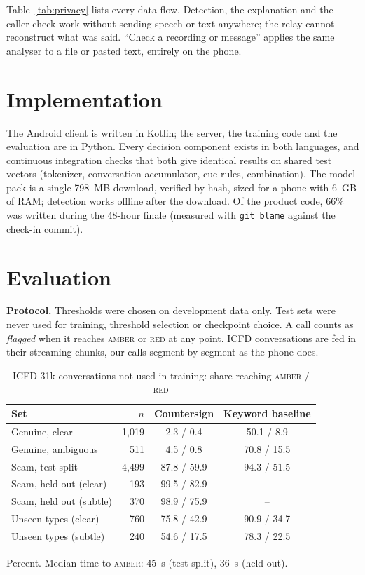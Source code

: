 \documentclass[conference,a4paper]{IEEEtran}
\newcommand{\amber}{\textsc{amber}}
\newcommand{\red}{\textsc{red}}
\begin{document}
Table~\ref{tab:privacy} lists every data flow. Detection, the explanation and the caller check work without sending
speech or text anywhere; the relay cannot reconstruct what was said. ``Check a recording or message'' applies the same
analyser to a file or pasted text, entirely on the phone.

\section{Implementation}

The Android client is written in Kotlin; the server, the training code and the evaluation are in Python. Every
decision component exists in both languages, and continuous integration checks that both give identical results on
shared test vectors (tokenizer, conversation accumulator, cue rules, combination). The model pack is a single
798~MB download, verified by hash, sized for a phone with 6~GB of RAM; detection works offline after the download. Of the
product code, 66\% was written during the 48-hour finale (measured with \texttt{git blame} against the check-in
commit).

\section{Evaluation}
\label{sec:eval}

\textbf{Protocol.} Thresholds were chosen on development data only. Test sets were never used for training,
threshold selection or checkpoint choice. A call counts as \emph{flagged} when it reaches \amber{} or \red{} at any
point. ICFD conversations are fed in their streaming chunks, our calls segment by segment as the phone does.

\begin{table}[t]
\centering
\caption{ICFD-31k conversations not used in training: share reaching \amber{} / \red{}}
\label{tab:icfd}
\small
\begin{tabular}{@{}lrcc@{}}
\toprule
Set & $n$ & Countersign & Keyword baseline \\
\midrule
Genuine, clear & 1{,}019 & 2.3 / 0.4 & 50.1 / 8.9 \\
Genuine, ambiguous & 511 & 4.5 / 0.8 & 70.8 / 15.5 \\
\midrule
Scam, test split & 4{,}499 & 87.8 / 59.9 & 94.3 / 51.5 \\
Scam, held out (clear) & 193 & 99.5 / 82.9 & -- \\
Scam, held out (subtle) & 370 & 98.9 / 75.9 & -- \\
Unseen types (clear) & 760 & 75.8 / 42.9 & 90.9 / 34.7 \\
Unseen types (subtle) & 240 & 54.6 / 17.5 & 78.3 / 22.5 \\
\bottomrule
\end{tabular}

\vspace{2pt}\footnotesize Percent. Median time to \amber{}: 45~s (test split), 36~s (held out).
\end{table}
\end{document}
